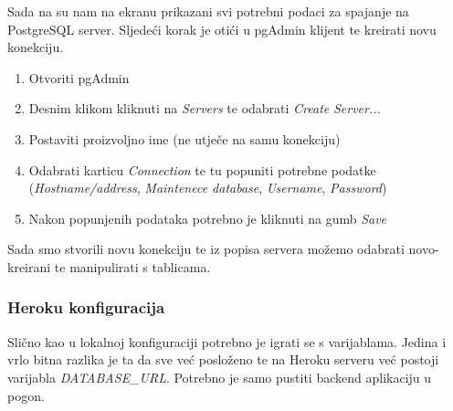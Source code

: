 								Sada na su nam na ekranu prikazani svi potrebni podaci za spajanje na PostgreSQL server. Sljedeći korak je otići u pgAdmin klijent te kreirati novu konekciju.
								
								\begin{enumerate}
										\item Otvoriti pgAdmin
										\item Desnim klikom kliknuti na \textit{Servers} te odabrati \textit{Create} \textit{Server...}
										\item Postaviti proizvoljno ime (ne utječe na samu konekciju)
										\item Odabrati karticu \textit{Connection} te tu popuniti potrebne podatke (\textit{Hostname/address}, \textit{Maintenece database}, \textit{Username}, \textit{Password})
										\item Nakon popunjenih podataka potrebno je kliknuti na gumb \textit{Save}
								\end{enumerate}
								
								Sada smo stvorili novu konekciju te iz popisa servera možemo odabrati novo-kreirani te manipulirati s tablicama.
								
				
						\subsubsection*{Heroku konfiguracija}
							
							Slično kao u lokalnoj konfiguraciji potrebno je igrati se s varijablama. Jedina i vrlo bitna razlika je ta da sve već posloženo te na Heroku serveru već postoji varijabla \textit{DATABASE\_URL}. Potrebno je samo pustiti backend aplikaciju u pogon.
					
			\eject